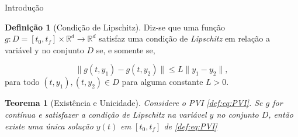 \documentclass{beamer}
\newcommand{\R}{\mathbb{R}}
\theoremstyle{plain}
\newtheorem{teo}{Teorema}
\theoremstyle{definition}
\newtheorem{defi}{Definição}
\begin{document}
\begin{frame}{Introdução}

    \begin{defi}[Condição de Lipschitz]
        \label{def:2:condicao_de_lispchitz}
        Diz-se que uma função $g: D = [t_0, t_f] \times \R^d \to \R^d$ satisfaz uma condição de \textit{Lipschitz} em relação a variável y no conjunto $D$ se, e somente se,

        \begin{equation}
            \| g(t, y_1) - g(t, y_2) \| \leq L \| y_1 - y_2 \|, 
            \label{def:IVP_Lips}
        \end{equation}
        para todo $(t, y_1), (t, y_2) \in D$ para alguma constante $L>0$.
    \end{defi}


    \begin{teo}[Existência e Unicidade]
        
    \label{teo:1:PVI:existencia_unicidade}
    Considere o PVI \eqref{def:eq:PVI}. Se $g$ for contínua e satisfazer a condição de Lipschitz na variável $y$ no conjunto $D$, então existe uma única solução $y(t)$ em $[t_0, t_f]$ de \eqref{def:eq:PVI} 
    \end{teo}


\end{frame}
\end{document}
